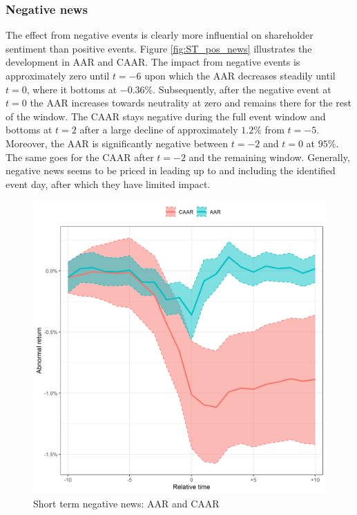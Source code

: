  \label{ST_tab}

\subsubsection{Negative news}

The effect from negative events is clearly more influential on shareholder sentiment than positive events. Figure \ref{fig:ST_pos_news} illustrates the development in AAR and CAAR. The impact from negative events is approximately zero until $t = -6$ upon which the AAR decreases steadily until $t=0$, where it bottoms at $-0.36\%$. Subsequently, after the negative event at $t=0$ the AAR increases towards neutrality at zero and remains there for the rest of the window. The CAAR stays negative during the full event window and bottoms at $t=2$ after a large decline of approximately $1.2\%$ from  $t=-5$.
Moreover, the AAR is significantly negative between $t=-2$ and $t=0$ at $95\%$. The same goes for the CAAR after $t=-2$ and the remaining window. Generally, negative news seems to be priced in leading up to and including the identified event day, after which they have limited impact. 

\begin{figure} [H]
    \centering
    \includegraphics[scale=0.6]{Projekt/1.Figures analysis/ST_negative_all_CI.png}
    \caption{Short term negative news: AAR and CAAR}
    \label{fig:ST_neg_news}
\end{figure}

